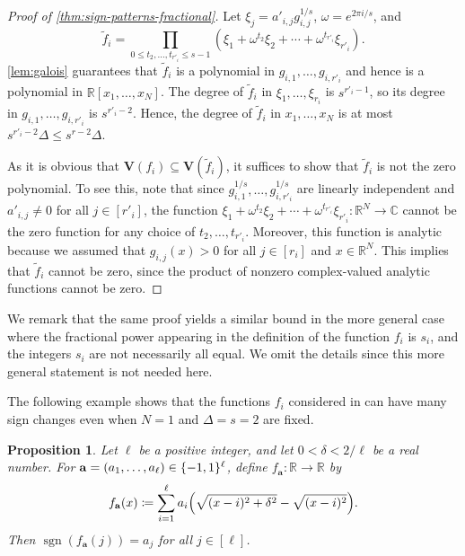 \documentclass[11pt]{amsart}
\newtheorem{proposition}[theorem]{Proposition}
\theoremstyle{definition}
\DeclarePairedDelimiter{\paren}{(}{)}
\DeclarePairedDelimiter{\set}{\{}{\}}
\DeclareMathOperator{\sgn}{sgn}
\let\Vec\mathbf
\newcommand{\RR}{\mathbb{R}}
\newcommand{\VV}{\mathbf{V}}
\begin{document}
\begin{proof}[Proof of \cref{thm:sign-patterns-fractional}]
Let $\xi_j=a'_{i,j}g_{i,j}^{1/s}$, $\omega = e^{2\pi i/s}$, and
\[
\tilde{f}_i=\prod_{0 \leq t_2,\ldots, t_{r'_i} \leq s-1} (\xi_1+\omega^{t_2} \xi_2+\cdots+\omega^{t_{r'_i}}\xi_{r'_i}).
\]
\cref{lem:galois} guarantees that $\tilde{f}_i$ is a polynomial in $g_{i,1}, \ldots, g_{i,r'_i}$ and hence is a polynomial in $\RR[x_1,\ldots,x_N]$.  The degree of $\tilde{f}_i$ in $\xi_1,\ldots,\xi_{r_i}$ is $s^{r'_i-1}$, so its degree in $g_{i,1}, \ldots, g_{i,r'_i}$ is $s^{r'_i-2}$. Hence, the degree of $\tilde f_i$ in $x_1, \ldots, x_N$ is at most $s^{r'_i-2}\Delta \leq s^{r-2}\Delta$.

As it is obvious that $\VV(f_i) \subseteq \VV(\tilde f_i)$, it suffices to show that  $\tilde{f}_i$ is not the zero polynomial. To see this, note that since $g_{i,1}^{1/s},\ldots,g^{1/s}_{i,r'_i}$ are linearly independent and $a'_{i,j} \neq 0$ for all $j \in [r'_i]$, the function $\xi_1+\omega^{t_2} \xi_2+\cdots+\omega^{t_{r'_i}}\xi_{r'_i}\colon\RR^N\to\mathbb C$ cannot be the zero function for any choice of $t_2,\ldots,t_{r'_i}$. Moreover, this function is analytic because we assumed that $g_{i,j}(x) > 0$ for all $j\in[r_i]$ and $x \in \RR^N$. This implies that $\tilde f_i$ cannot be zero, since the product of nonzero complex-valued analytic functions cannot be zero.
\end{proof}
We remark that the same proof yields a similar bound in the more general case where the fractional power appearing in the definition
of the function $f_i$ is $s_i$, and the integers $s_i$ are not necessarily all equal. We omit the details since this more general statement is not needed here.

The following example shows that the functions $f_i$ considered in  can have many sign changes even when $N=1$ and $\Delta=s=2$ are fixed.

\begin{proposition}
\label{prop:noga}
Let $\ell$ be a positive integer, and let $0<\delta<2/\ell$ be a real number.  For $\Vec a=(a_1, \ldots, a_\ell) \in \set{-1,1}^\ell$, define $f_{\Vec a}\colon\RR\to\RR$ by
\[
f_{\Vec a}(x)\coloneqq\sum_{i=1}^\ell a_i \paren*{\sqrt{(x-i)^2 +\delta^2} - \sqrt{(x-i)^2}}.
\]
Then $\sgn(f_{\Vec a}(j))=a_j$ for all $j\in[\ell]$. 
\end{proposition}
\end{document}
